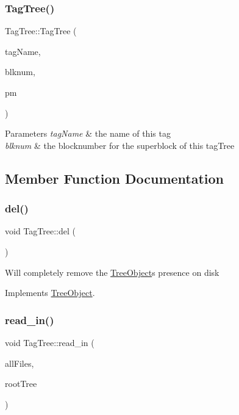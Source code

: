 \subsubsection{\texorpdfstring{Tag\+Tree()}{TagTree()}}
{\footnotesize\ttfamily Tag\+Tree\+::\+Tag\+Tree (\begin{DoxyParamCaption}\item[{string}]{tag\+Name,  }\item[{Blk\+Num\+Type}]{blknum,  }\item[{\mbox{\hyperlink{classPartitionManager}{Partition\+Manager}} $\ast$}]{pm }\end{DoxyParamCaption})}


\begin{DoxyParams}{Parameters}
{\em tag\+Name} & the name of this tag \\
\hline
{\em blknum} & the blocknumber for the superblock of this tag\+Tree \\
\hline
\end{DoxyParams}


\subsection{Member Function Documentation}
\mbox{\label{classTagTree_ad8108969f4d28b938e55c8339f19db35}} 
\subsubsection{\texorpdfstring{del()}{del()}}
{\footnotesize\ttfamily void Tag\+Tree\+::del (\begin{DoxyParamCaption}{ }\end{DoxyParamCaption})\hspace{0.3cm}{\ttfamily [virtual]}}

Will completely remove the \mbox{\hyperlink{classTreeObject}{Tree\+Object}}\textquotesingle{}s presence on disk 

Implements \mbox{\hyperlink{classTreeObject_af390b7479aa972888e594c07a85740b6}{Tree\+Object}}.

\mbox{\label{classTagTree_af86ee6713fa03c3909e04608512b8b62}} 
\subsubsection{\texorpdfstring{read\+\_\+in()}{read\_in()}}
{\footnotesize\ttfamily void Tag\+Tree\+::read\+\_\+in (\begin{DoxyParamCaption}\item[{unordered\+\_\+multimap$<$ string, \mbox{\hyperlink{classFileInfo}{File\+Info}} $\ast$$>$ $\ast$}]{all\+Files,  }\item[{\mbox{\hyperlink{classRootTree}{Root\+Tree}} $\ast$}]{root\+Tree }\end{DoxyParamCaption})\hspace{0.3cm}{\ttfamily [virtual]}}

